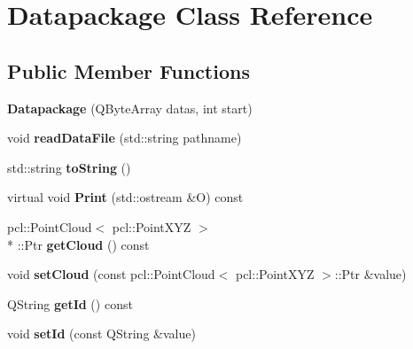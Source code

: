 \hypertarget{classDatapackage}{\section{Datapackage Class Reference}
\label{classDatapackage}
}
\subsection*{Public Member Functions}
\begin{DoxyCompactItemize}
\item 
\hypertarget{classDatapackage_a25969cd74b7b4ecbafd0e622677821cb}{{\bfseries Datapackage} (Q\-Byte\-Array datas, int start)}\label{classDatapackage_a25969cd74b7b4ecbafd0e622677821cb}

\item 
\hypertarget{classDatapackage_a907b7ec8ca3b802bf8d041b645306b10}{void {\bfseries read\-Data\-File} (std\-::string pathname)}\label{classDatapackage_a907b7ec8ca3b802bf8d041b645306b10}

\item 
\hypertarget{classDatapackage_a69e500a0bdfb3086ab164d7b08a19af8}{std\-::string {\bfseries to\-String} ()}\label{classDatapackage_a69e500a0bdfb3086ab164d7b08a19af8}

\item 
\hypertarget{classDatapackage_a69f2633667d6665a8e5a9e25bde93c1d}{virtual void {\bfseries Print} (std\-::ostream \&O) const }\label{classDatapackage_a69f2633667d6665a8e5a9e25bde93c1d}

\item 
\hypertarget{classDatapackage_abaa431b4807d967d0b7ab5515f08edcf}{pcl\-::\-Point\-Cloud$<$ pcl\-::\-Point\-X\-Y\-Z $>$\\*
\-::Ptr {\bfseries get\-Cloud} () const }\label{classDatapackage_abaa431b4807d967d0b7ab5515f08edcf}

\item 
\hypertarget{classDatapackage_abc1ad9b2f943a6d467726dda778595cb}{void {\bfseries set\-Cloud} (const pcl\-::\-Point\-Cloud$<$ pcl\-::\-Point\-X\-Y\-Z $>$\-::Ptr \&value)}\label{classDatapackage_abc1ad9b2f943a6d467726dda778595cb}

\item 
\hypertarget{classDatapackage_ac077faf854d6a3f6d5a608afd5b05364}{Q\-String {\bfseries get\-Id} () const }\label{classDatapackage_ac077faf854d6a3f6d5a608afd5b05364}

\item 
\hypertarget{classDatapackage_a3ffb4caf156e1f7dbadd70995acf1838}{void {\bfseries set\-Id} (const Q\-String \&value)}\label{classDatapackage_a3ffb4caf156e1f7dbadd70995acf1838}


\end{DoxyCompactItemize}
